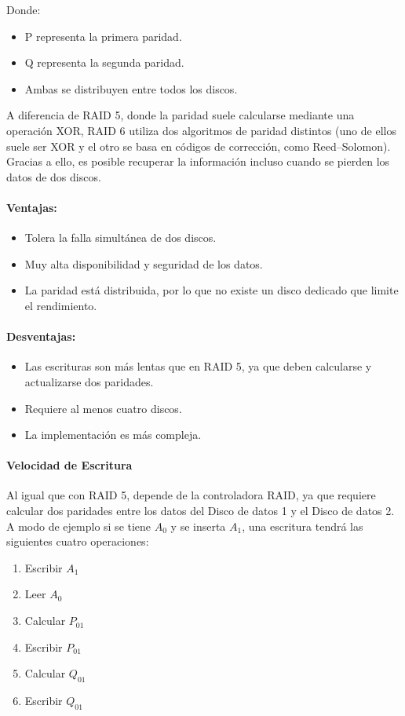 Donde:
\begin{itemize}
  \item P representa la primera paridad.
  \item Q representa la segunda paridad.
  \item Ambas se distribuyen entre todos los discos.
\end{itemize}
A diferencia de RAID 5, donde la paridad suele calcularse mediante una operación XOR, RAID 6 utiliza dos algoritmos de paridad distintos (uno de ellos suele ser XOR y el otro se basa en códigos de corrección, como Reed--Solomon). Gracias a ello, es posible recuperar la información incluso cuando se pierden los datos de dos discos.

\paragraph{Ventajas:}
\begin{itemize}
  \item Tolera la falla simultánea de dos discos.
  \item Muy alta disponibilidad y seguridad de los datos.
  \item La paridad está distribuida, por lo que no existe un disco dedicado que limite el rendimiento.
\end{itemize}

\paragraph{Desventajas:}
\begin{itemize}
  \item Las escrituras son más lentas que en RAID 5, ya que deben calcularse y actualizarse dos paridades.
  \item Requiere al menos cuatro discos.
  \item La implementación es más compleja.
\end{itemize}

\paragraph{Velocidad de Escritura}
Al igual que con RAID 5, depende de la controladora RAID, ya que requiere calcular dos paridades entre los datos del Disco de datos 1 y el Disco de datos 2. A modo de ejemplo si se tiene \(A_0\) y se inserta \(A_1\), una escritura tendrá las siguientes cuatro operaciones:
\begin{enumerate}
  \item Escribir \(A_1\)
  \item Leer \(A_0\)
  \item Calcular \(P_{01}\)
  \item Escribir \(P_{01}\)
  \item Calcular \(Q_{01}\)
  \item Escribir \(Q_{01}\)
\end{enumerate}

